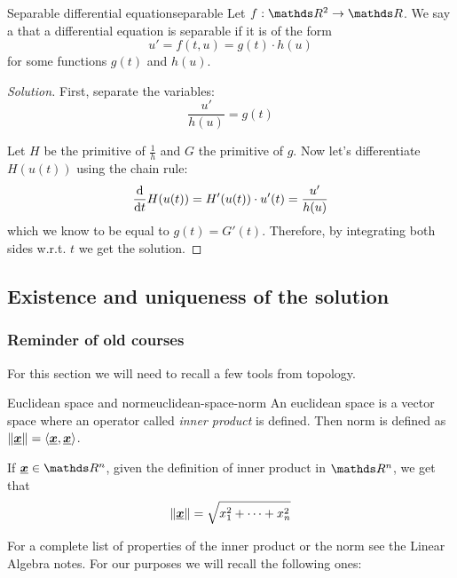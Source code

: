 \documentclass[12pt]{extarticle}
\renewcommand{\vec}[1]{\uvec{#1}}
\begin{document}
\begin{definition}{Separable differential equation}{separable}
	Let $f: \R^2 \to \R$.
	We say a that a differential equation is separable if it is of the form
	\begin{equation}
		u' = f(t, u) = g(t) \cdot h(u)
	\end{equation}
	for some functions $g(t)$ and $h(u)$.
\end{definition}

\begin{proof}[Solution]
	First, separate the variables:
	\begin{equation}
		\frac{u'}{h(u)} = g(t)
	\end{equation}

	Let $H$ be the primitive of $\frac{1}{h}$ and $G$ the primitive of $g$.
	Now let's differentiate $H(u(t))$ using the chain rule:
	\begin{equation}
		\dv{t} H(u(t)) = H'(u(t)) \cdot u'(t) = \frac{u'}{h(u)}
	\end{equation}
	which we know to be equal to $g(t) = G'(t)$.
	Therefore, by integrating both sides w.r.t. $t$ we get the solution.
\end{proof}

\subsection{Existence and uniqueness of the solution}

\subsubsection{Reminder of old courses}

For this section we will need to recall a few tools from topology.

\begin{definition}{Euclidean space and norm}{euclidean-space-norm}
	An euclidean space is a vector space where an operator called \textit{inner product} is defined.
	Then norm is defined as $\norm{\vec x} = \langle \vec x, \vec x \rangle$.

	If $\vec x \in \R^n$, given the definition of inner product in $\R^n$, we get that
	\begin{equation}
		\norm{\vec x} = \sqrt{x_1^2 + \dots + x_n^2}
	\end{equation}
\end{definition}

For a complete list of properties of the inner product or the norm see the Linear Algebra notes.
For our purposes we will recall the following ones:
\end{document}
